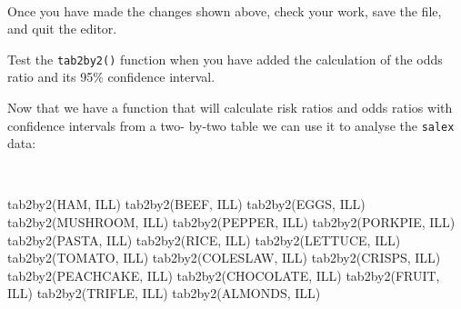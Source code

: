 \documentclass[
  12pt,
]{book}
\newenvironment{Shaded}{\begin{snugshade}}{\end{snugshade}}
\newcommand{\FunctionTok}[1]{\textcolor[rgb]{0.00,0.00,0.00}{#1}}
\newcommand{\NormalTok}[1]{#1}
\newcommand{\SpecialCharTok}[1]{\textcolor[rgb]{0.00,0.00,0.00}{#1}}
\newcommand{\StringTok}[1]{\textcolor[rgb]{0.31,0.60,0.02}{#1}}
\begin{document}
\begin{Shaded}
\end{Shaded}

~

Once you have made the changes shown above, check your work, save the file, and quit the editor.

\newpage

Test the \texttt{tab2by2()} function when you have added the calculation of the odds ratio and its 95\% confidence interval.

Now that we have a function that will calculate risk ratios and odds ratios with confidence intervals from a two- by-two table we can use it to analyse the \texttt{salex} data:

~

\begin{Shaded}
\begin{Highlighting}[]
\FunctionTok{tab2by2}\NormalTok{(HAM, ILL)}
\FunctionTok{tab2by2}\NormalTok{(BEEF, ILL)}
\FunctionTok{tab2by2}\NormalTok{(EGGS, ILL)}
\FunctionTok{tab2by2}\NormalTok{(MUSHROOM, ILL)}
\FunctionTok{tab2by2}\NormalTok{(PEPPER, ILL)}
\FunctionTok{tab2by2}\NormalTok{(PORKPIE, ILL)}
\FunctionTok{tab2by2}\NormalTok{(PASTA, ILL)}
\FunctionTok{tab2by2}\NormalTok{(RICE, ILL)}
\FunctionTok{tab2by2}\NormalTok{(LETTUCE, ILL)}
\FunctionTok{tab2by2}\NormalTok{(TOMATO, ILL)}
\FunctionTok{tab2by2}\NormalTok{(COLESLAW, ILL)}
\FunctionTok{tab2by2}\NormalTok{(CRISPS, ILL)}
\FunctionTok{tab2by2}\NormalTok{(PEACHCAKE, ILL)}
\FunctionTok{tab2by2}\NormalTok{(CHOCOLATE, ILL)}
\FunctionTok{tab2by2}\NormalTok{(FRUIT, ILL)}
\FunctionTok{tab2by2}\NormalTok{(TRIFLE, ILL)}
\FunctionTok{tab2by2}\NormalTok{(ALMONDS, ILL)}
\end{Highlighting}
\end{Shaded}
\end{document}
